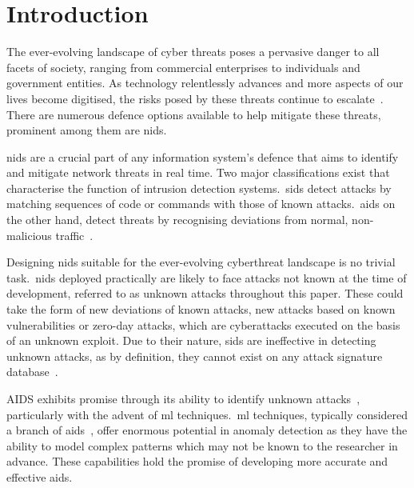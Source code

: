 \chapter{Introduction}%
\label{chp:introduction}


The ever-evolving landscape of cyber threats poses a pervasive danger to all
facets of society, ranging from commercial enterprises to individuals and
government entities. As technology relentlessly advances and more aspects of
our lives become digitised, the risks posed by these threats continue to
escalate~\cite{ENISA}. There are numerous defence options available to help
mitigate these threats, prominent among them are \gls{nids}.

\gls{nids} are a crucial part of any information system's defence that aims to
identify and mitigate network threats in real time. Two major classifications
exist that characterise the function of intrusion detection systems.\ \gls{sids}
detect attacks by matching sequences of code or commands with those of known
attacks.\ \gls{aids} on the other hand, detect threats by recognising
deviations from normal, non-malicious traffic~\cite{survey1}.

Designing \gls{nids} suitable for the ever-evolving cyberthreat landscape is no
trivial task.\ \gls{nids} deployed practically are likely to face attacks not
known at the time of development, referred to as unknown attacks throughout
this paper. These could take the form of new deviations of known attacks, new
attacks based on known vulnerabilities or zero-day attacks, which are
cyberattacks executed on the basis of an unknown exploit. Due to their nature,
\gls{sids} are ineffective in detecting unknown attacks, as by definition, they
cannot exist on any attack signature database~\cite{survey1}.

AIDS exhibits promise through its ability to identify unknown
attacks~\cite{aids-unknown}, particularly with the advent of \gls{ml}
techniques.\ \gls{ml} techniques, typically considered a branch of
\gls{aids}~\cite{survey1}, offer enormous potential in anomaly detection as
they have the ability to model complex patterns which may not be known to the
researcher in advance. These capabilities hold the promise of developing more
accurate and effective \gls{aids}.

